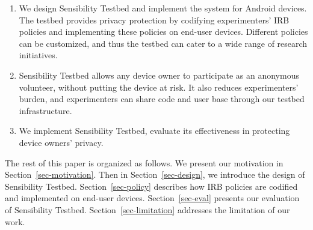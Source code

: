 \begin{enumerate}

\item We design Sensibility Testbed and implement the 
system for Android devices. The testbed provides privacy protection by 
codifying experimenters' IRB policies and implementing 
these policies on end-user devices. Different policies can 
be customized, and thus the testbed can cater to a wide 
range of research initiatives.


\item Sensibility Testbed allows any device owner to participate 
as an anonymous volunteer, without putting the device at risk. 
It also reduces experimenters' burden, and experimenters can share 
code and user base through our testbed infrastructure.


\item We implement Sensibility Testbed, evaluate its effectiveness
in protecting device owners' privacy. 
\end{enumerate}

The rest of this paper is organized as follows. We present our
motivation in Section~\ref{sec-motivation}. Then in Section~\ref{sec-design}, 
we introduce the design of Sensibility Testbed. Section~\ref{sec-policy}
describes how IRB policies are codified and implemented on end-user
devices. Section~\ref{sec-eval} presents our evaluation of Sensibility 
Testbed. Section~\ref{sec-limitation} addresses the limitation of our work.
